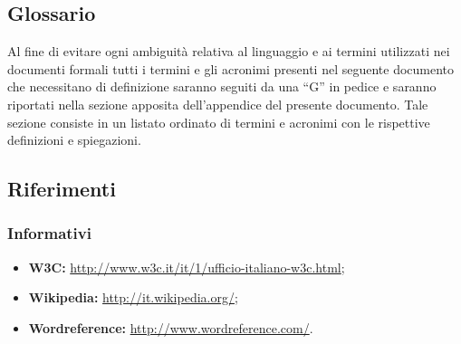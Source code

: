 \subsection{Glossario}
Al fine di evitare ogni ambiguità relativa al linguaggio e ai termini utilizzati nei documenti formali tutti i termini e gli acronimi presenti nel seguente documento che necessitano di definizione saranno seguiti da una ``G'' in pedice e saranno riportati nella sezione apposita dell'appendice del presente documento. Tale sezione consiste in un listato ordinato di termini e acronimi con le rispettive definizioni e spiegazioni.

\subsection{Riferimenti}
\subsubsection{Informativi}
\begin{itemize}
	\item \textbf{W3C:} \href{http://www.w3c.it/it/1/ufficio-italiano-w3c.html}{http://www.w3c.it/it/1/ufficio-italiano-w3c.html};
	\item \textbf{Wikipedia:} \href{http://it.wikipedia.org/}{http://it.wikipedia.org/}; 
	\item \textbf{Wordreference:} \href{http://www.wordreference.com/}{http://www.wordreference.com/}.
\end{itemize}

\newpage